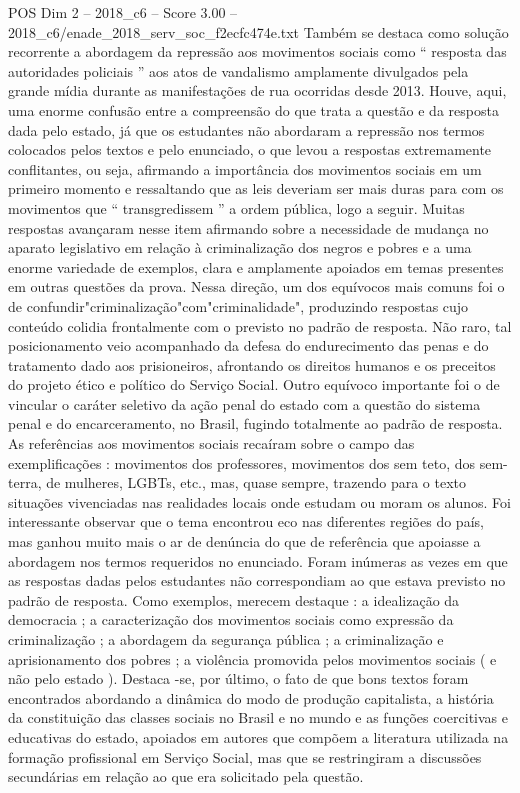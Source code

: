 \begin{textsample}{POS Dim 2 – 2018\_c6 – Score 3.00 – 2018\_c6/enade\_2018\_serv\_soc\_f2ecfc474e.txt}
Também se destaca como solução recorrente a abordagem da repressão aos movimentos sociais como “ resposta das autoridades policiais ” aos atos de vandalismo amplamente divulgados pela grande mídia durante as manifestações de rua ocorridas desde 2013.
Houve, aqui, uma enorme confusão entre a compreensão do que trata a questão e da resposta dada pelo estado, já que os estudantes não abordaram a repressão nos termos colocados pelos textos e pelo enunciado, o que levou a respostas extremamente conflitantes, ou seja, afirmando a importância dos movimentos sociais em um primeiro momento e ressaltando que as leis deveriam ser mais duras para com os movimentos que “ transgredissem ” a ordem pública, logo a seguir.
Muitas respostas avançaram nesse item afirmando sobre a necessidade de mudança no aparato legislativo em relação à criminalização dos negros e pobres e a uma enorme variedade de exemplos, clara e amplamente apoiados em temas presentes em outras questões da prova.
Nessa direção, um dos equívocos mais comuns foi o de confundir"criminalização"com"criminalidade", produzindo respostas cujo conteúdo colidia frontalmente com o previsto no padrão de resposta.
Não raro, tal posicionamento veio acompanhado da defesa do endurecimento das penas e do tratamento dado aos prisioneiros, afrontando os direitos humanos e os preceitos do projeto ético e político do Serviço Social.
Outro equívoco importante foi o de vincular o caráter seletivo da ação penal do estado com a questão do sistema penal e do encarceramento, no Brasil, fugindo totalmente ao padrão de resposta.
As referências aos movimentos sociais recaíram sobre o campo das exemplificações : movimentos dos professores, movimentos dos sem teto, dos sem-terra, de mulheres, LGBTs, etc., mas, quase sempre, trazendo para o texto situações vivenciadas nas realidades locais onde estudam ou moram os alunos.
Foi interessante observar que o tema encontrou eco nas diferentes regiões do país, mas ganhou muito mais o ar de denúncia do que de referência que apoiasse a abordagem nos termos requeridos no enunciado.
Foram inúmeras as vezes em que as respostas dadas pelos estudantes não correspondiam ao que estava previsto no padrão de resposta.
Como exemplos, merecem destaque : a idealização da democracia ; a caracterização dos movimentos sociais como expressão da criminalização ; a abordagem da segurança pública ; a criminalização e aprisionamento dos pobres ; a violência promovida pelos movimentos sociais ( e não pelo estado ).
Destaca -se, por último, o fato de que bons textos foram encontrados abordando a dinâmica do modo de produção capitalista, a história da constituição das classes sociais no Brasil e no mundo e as funções coercitivas e educativas do estado, apoiados em autores que compõem a literatura utilizada na formação profissional em Serviço Social, mas que se restringiram a discussões secundárias em relação ao que era solicitado pela questão.

\end{textsample}
